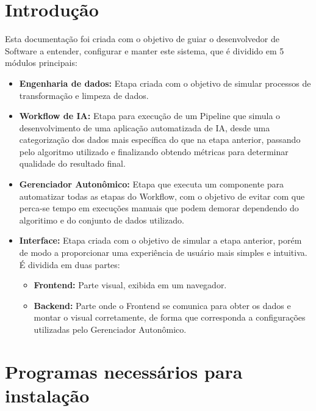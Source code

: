 \documentclass[portugues]{ic-tese}
\begin{document}
\section{Introdução}

Esta documentação foi criada com o objetivo de guiar o desenvolvedor de Software a entender, configurar e manter este sistema, que é dividido em 5 módulos principais:

\begin{itemize}
    \item {\textbf{Engenharia de dados:}} Etapa criada com o objetivo de simular processos de transformação e limpeza de dados.
    \item {\textbf{Workflow de IA:}} Etapa para execução de um Pipeline que simula o desenvolvimento de uma aplicação automatizada de IA, desde uma categorização dos dados mais específica do que na etapa anterior, passando pelo algoritmo utilizado e finalizando obtendo métricas para determinar qualidade do resultado final.
    \item {\textbf{Gerenciador Autonômico:}} Etapa que executa um componente para automatizar todas as etapas do Workflow, com o objetivo de evitar com que perca-se tempo em execuções manuais que podem demorar dependendo do algoritimo e do conjunto de dados utilizado.
    \item {\textbf{Interface:}} Etapa criada com o objetivo de simular a etapa anterior, porém de modo a proporcionar uma experiência de usuário mais simples e intuitiva. É dividida em duas partes:
    \begin{itemize}
        \item {\textbf{Frontend:}} Parte visual, exibida em um navegador.
        \item \textbf{{Backend:}} Parte onde o Frontend se comunica para obter os dados e montar o visual corretamente, de forma que corresponda a configurações utilizadas pelo Gerenciador Autonômico.
    \end{itemize}
\end{itemize}

\section{Programas necessários para instalação}
\end{document}

